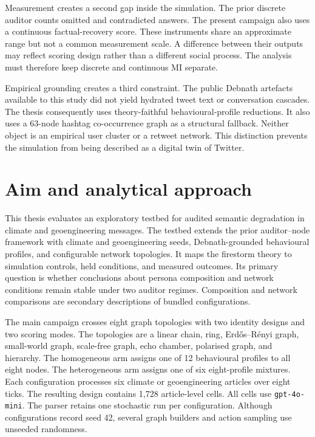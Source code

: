 Measurement creates a second gap inside the simulation.
The prior discrete auditor counts omitted and contradicted answers.
The present campaign also uses a continuous factual-recovery score.
These instruments share an approximate range but not a common measurement scale.
A difference between their outputs may reflect scoring design rather than a different social process.
The analysis must therefore keep discrete and continuous MI separate.

Empirical grounding creates a third constraint.
The public Debnath artefacts available to this study did not yield hydrated tweet text or conversation cascades.
The thesis consequently uses theory-faithful behavioural-profile reductions.
It also uses a 63-node hashtag co-occurrence graph as a structural fallback.
Neither object is an empirical user cluster or a retweet network.
This distinction prevents the simulation from being described as a digital twin of Twitter.

\section{Aim and analytical approach}
\label{sec:introduction_aim}

This thesis evaluates an exploratory testbed for audited semantic degradation
in climate and geoengineering messages.
The testbed extends the prior auditor--node framework with climate and geoengineering seeds, Debnath-grounded behavioural profiles, and configurable network topologies.
It maps the firestorm theory to simulation controls, held conditions, and measured outcomes.
Its primary question is whether conclusions about persona composition and
network conditions remain stable under two auditor regimes. Composition and
network comparisons are secondary descriptions of bundled configurations.

The main campaign crosses eight graph topologies with two identity designs and two scoring modes.
The topologies are a linear chain, ring, Erdős--Rényi graph, small-world graph, scale-free graph, echo chamber, polarised graph, and hierarchy.
The homogeneous arm assigns one of 12 behavioural profiles to all eight nodes.
The heterogeneous arm assigns one of six eight-profile mixtures.
Each configuration processes six climate or geoengineering articles over eight ticks.
The resulting design contains 1,728 article-level cells.
All cells use \texttt{gpt-4o-mini}. The parser retains one stochastic run per
configuration. Although configurations record seed 42, several graph builders
and action sampling use unseeded randomness.

